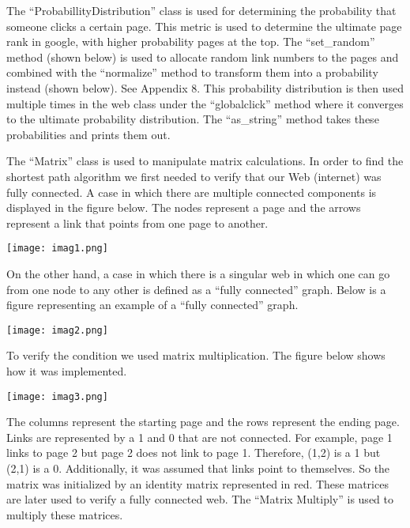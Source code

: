 \documentclass{article}
\begin{document}
The “ProbabillityDistribution” class is used for determining the probability that someone clicks a certain page. This metric is used to determine the ultimate page rank in google, with higher probability pages at the top. The “set\_random” method (shown below) is used to allocate random link numbers to the pages and combined with the “normalize” method to transform them into a probability instead (shown below). See Appendix 8. This probability distribution is then used multiple times in the web class under the “globalclick” method where it converges to the ultimate probability distribution. The “as\_string” method takes these probabilities and prints them out.
\bigskip

\bigskip \bigskip
The “Matrix” class is used to manipulate matrix calculations. In order to find the shortest path algorithm we first needed to verify that our Web (internet) was fully connected. A case in which there are multiple connected components is displayed in the figure below. The nodes represent a page and the arrows represent a link that points from one page to another.

\begin{center}
   \texttt{[image: imag1.png]} 
\end{center}

\bigskip \bigskip \bigskip \bigskip\bigskip \bigskip \bigskip \bigskip\bigskip \bigskip \bigskip \bigskip\bigskip \bigskip
On the other hand, a case in which there is a singular web in which one can go from one node to any other is defined as a “fully connected” graph. Below is a figure representing an example of a “fully connected” graph.  \bigskip

\begin{center}
   \texttt{[image: imag2.png]} 
\end{center}

\bigskip
To verify the condition we used matrix multiplication. The figure below shows how it was implemented. 
\bigskip

\begin{center}
   \texttt{[image: imag3.png]} 
\end{center}

The columns represent the starting page and the rows represent the ending page. Links are represented by a 1 and 0 that are not connected. For example, page 1 links to page 2 but page 2 does not link to page 1. Therefore, (1,2) is a 1 but (2,1) is a 0. Additionally, it was assumed that links point to themselves.  So the matrix was initialized by an identity matrix represented in red. These matrices are later used to verify a fully connected web. The “Matrix Multiply” is used to multiply these matrices.
\bigskip\bigskip\bigskip\bigskip\bigskip\bigskip
\end{document}
